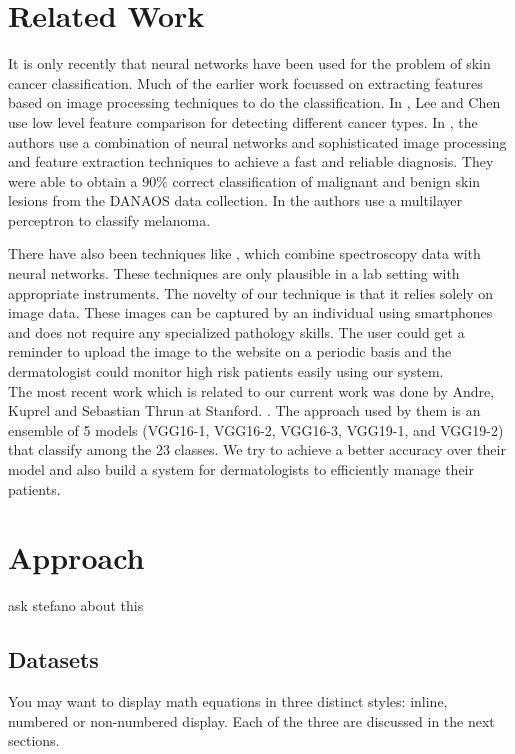 \documentclass{sig-alternate-05-2015}
\begin{document}
\section{Related Work}
It is only recently that neural networks have been used for the problem of skin cancer classification. Much of the earlier work focussed
on extracting features based on image processing techniques to do the classification. In \cite{DBLP:journals/eswa/LeeC15}, Lee and Chen use low
level feature comparison for detecting different cancer types. In \cite{Kreutz2001}, the authors use a combination of neural networks and 
sophisticated image processing and feature extraction techniques to achieve a fast and reliable diagnosis. They were able to obtain a 
90\% correct classification of malignant and benign skin lesions from the DANAOS data collection. In \cite{Sheha_automaticdetection} the authors use 
a multilayer perceptron to classify melanoma.

There have also been techniques like \cite{Gniadecka2004443}, \cite{Zhao:15} which combine spectroscopy data with neural networks. These techniques
are only plausible in a lab setting with appropriate instruments. The novelty of our technique is that it relies solely on image data.
These images can be captured by an individual using smartphones and does not require any specialized pathology skills. The user could get a reminder
to upload the image to the website on a periodic basis and the dermatologist could monitor high risk patients easily using our system.\\
The most recent work which is related to our current work was done by Andre, Kuprel and Sebastian Thrun at Stanford. \cite{esteva-skincancer-manuscript}.
The approach used by them is an ensemble of 5 models (VGG16-1, VGG16-2, VGG16-3, VGG19-1, and VGG19-2) that classify among the 23 classes. We try to
achieve a better accuracy over their model and also build a system for dermatologists to efficiently manage their patients.

\section{Approach}
ask stefano about this

\subsection{Datasets}
You may want to display math equations in three distinct styles:
inline, numbered or non-numbered display.  Each of
the three are discussed in the next sections.
\end{document}
